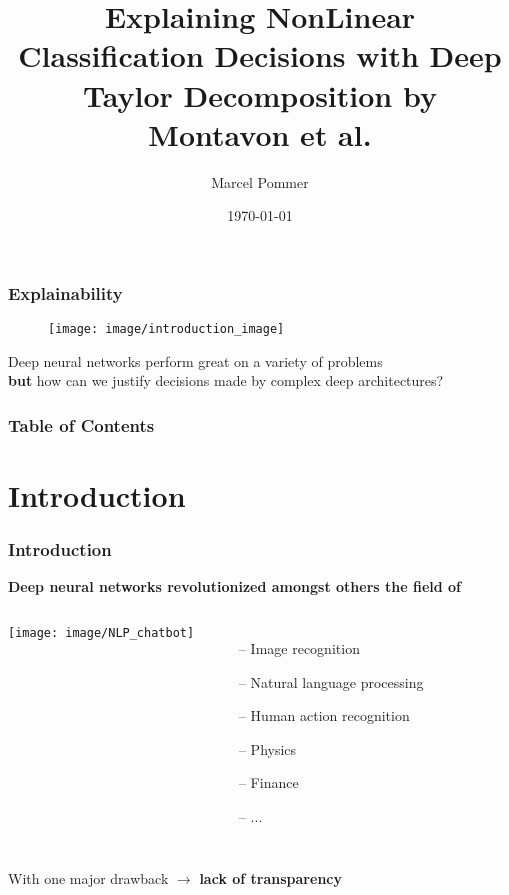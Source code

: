 \documentclass{beamer}
\begin{document}
\title[Deep Taylor Decomposition]{Explaining NonLinear Classification Decisions with Deep Taylor Decomposition by Montavon et al.}  
\author{Marcel Pommer}
\date{\today} 

\begin{frame}
\titlepage
\end{frame} 

\begin{frame}
\frametitle[Explainability]{Explainability}
\vspace{0.25cm}
\begin{figure}
\texttt{[image: image/introduction\_image]}
\end{figure}
\vspace{0.25cm}
Deep neural networks perform great on a variety of problems \nocite{*}\\
\textbf{but} how can we justify decisions made by complex deep architectures?\\
\end{frame} 


\begin{frame}
\frametitle[Table of Contents]{Table of Contents}
\vspace{0.4cm}
\tableofcontents
\end{frame} 



\section[Introduction]{Introduction}
\begin{frame}
\frametitle{Introduction} 
\textbf{Deep neural networks revolutionized amongst others the field of}\\
\vspace{0.25cm}
       \begin{columns}[T]
             \centering
             \texttt{[image: image/NLP\_chatbot]}
			\begin{itemize}
			\item[--] Image recognition
			\item[--] Natural language processing
			\item[--] Human action recognition
			\item[--] Physics
			\item[--] Finance
			\item[--] ...
			\end{itemize}
         \end{columns} 
\vspace{0.5cm}
With one major drawback $\rightarrow$ \textbf{lack of transparency}
\end{frame}
\end{document}
